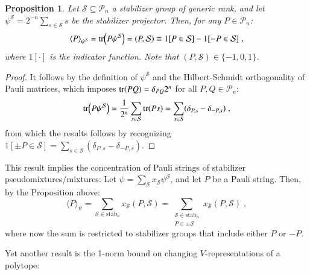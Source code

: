 \documentclass[10pt,aps,pra,twocolumn,floatfix,nofootinbib,superscriptaddress,longbibliography]{revtex4-2}
\newcommand{\1}{\mathbbm{1}}
\newtheorem{prop}[thm]{Proposition}
\begin{document}
\begin{prop}
    Let $\mathcal S \subseteq \mathcal P_n$ a stabilizer group of generic rank, and let $\psi^\mathcal S = 2^{-n}\sum_{s \in \mathcal S}s$ be the stabilizer projector. Then, for any $P \in \mathcal P_n$:
    \begin{equation}
       \langle P \rangle_{\psi^\mathcal S} = \tr(P \psi^\mathcal S) = (P, \mathcal S)\equiv  1[P \in \mathcal S]- 1[-P \in \mathcal S]\;, 
    \end{equation}
    where $1[\cdot]$ is the indicator function. Note that $(P, \mathcal S) \in \{-1,0,1\}$.
    \label{prop:paulistab}
\end{prop}
\begin{proof}
    It follows by the definition of $\psi^\mathcal S$ and the Hilbert-Schmidt orthogonality of Pauli matrices, which imposes $\tr(PQ) =\delta_{PQ}2^n$ for all $P, Q \in \mathcal P_n$:
    \begin{equation}
        \tr(P \psi^\mathcal S) = \frac{1}{2^{n}}\sum_{s \in \mathcal S} \tr(Ps) = \sum_{s \in \mathcal S}(\delta_{P,s}-\delta_{-P,s})\;,
    \end{equation}
from which the results follows by recognizing $1[\pm P \in \mathcal S] = \sum_{s \in \mathcal S}(\delta_{P,s}-\delta_{-P,s})$.
\end{proof}

This result implies the concentration of Pauli strings of stabilizer pseudomixtures/mixtures: Let $\psi =\sum_\mathcal S x_\mathcal S \psi^\mathcal S$, and let $P$ be a Pauli string. Then, by the Proposition above:
\begin{equation}
    \langle P\rangle_\psi = \sum_{\mathcal S \in \mathrm{stab}_n}x_\mathcal S (P, \mathcal S) = \sum_{\substack{\mathcal S \in \mathrm{stab}_n\\ P \in \pm \mathcal S}}x_\mathcal S (P, \mathcal S)\;,
    \label{eq:pauliexpecpseudo}
\end{equation}
where now the sum is restricted to stabilizer groups that include either $P$ or $-P$.


Yet another result is the 1-norm bound on changing $V$-representations of a polytope:
\end{document}
